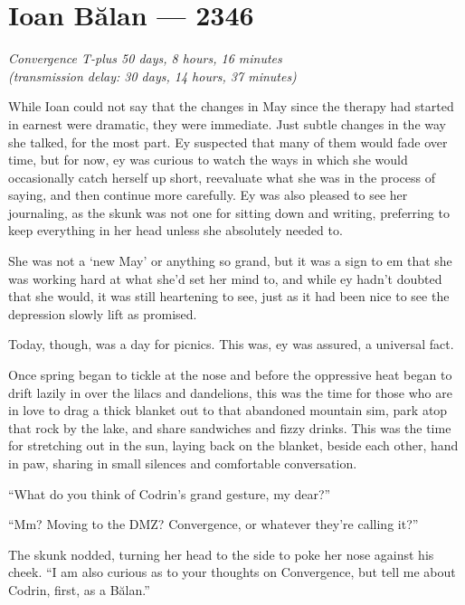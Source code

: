 \hypertarget{ioan-bux103lan-2346}{%
\chapter{Ioan Bălan — 2346}\label{ioan-bux103lan-2346}}

\begin{center}
\emph{Convergence T-plus 50 days, 8 hours, 16 minutes}\\
\emph{(transmission delay: 30 days, 14 hours, 37 minutes)}
\end{center}

\noindent While Ioan could not say that the changes in May since the therapy had started in earnest were dramatic, they were immediate. Just subtle changes in the way she talked, for the most part. Ey suspected that many of them would fade over time, but for now, ey was curious to watch the ways in which she would occasionally catch herself up short, reevaluate what she was in the process of saying, and then continue more carefully. Ey was also pleased to see her journaling, as the skunk was not one for sitting down and writing, preferring to keep everything in her head unless she absolutely needed to.

She was not a `new May' or anything so grand, but it was a sign to em that she was working hard at what she'd set her mind to, and while ey hadn't doubted that she would, it was still heartening to see, just as it had been nice to see the depression slowly lift as promised.

Today, though, was a day for picnics. This was, ey was assured, a universal fact.

Once spring began to tickle at the nose and before the oppressive heat began to drift lazily in over the lilacs and dandelions, this was the time for those who are in love to drag a thick blanket out to that abandoned mountain sim, park atop that rock by the lake, and share sandwiches and fizzy drinks. This was the time for stretching out in the sun, laying back on the blanket, beside each other, hand in paw, sharing in small silences and comfortable conversation.

``What do you think of Codrin's grand gesture, my dear?''

``Mm? Moving to the DMZ? Convergence, or whatever they're calling it?''

The skunk nodded, turning her head to the side to poke her nose against his cheek. ``I am also curious as to your thoughts on Convergence, but tell me about Codrin, first, as a Bălan.''

